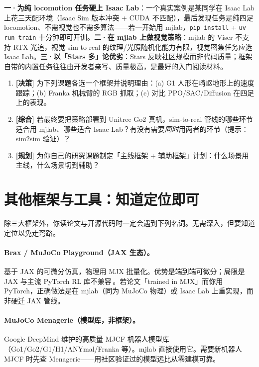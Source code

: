 \begin{pitfall}[选型阶段三个高频踩坑]
\textbf{一·为纯 locomotion 任务硬上 Isaac Lab}：一个真实案例是某同学在 Isaac Lab 上花三天配环境（Isaac Sim 版本冲突 + CUDA 不匹配），最后发现任务是纯四足 locomotion、不需视觉也不需多算法——若一开始用 mjlab，\verb|pip install| + \verb|uv run train| 十分钟即可开训。\textbf{二·在 mjlab 上做视觉策略}：mjlab 的 Viser 不支持 RTX 光追，视觉 sim-to-real 的纹理/光照随机化能力有限，视觉密集任务应选 Isaac Lab。\textbf{三·以「Stars 多」论优劣}：Stars 反映社区规模而非代码质量；框架自带的内置任务往往由开发者亲写、质量极高，是最好的入门阅读材料。
\end{pitfall}

\begin{practice}[练习·选型]
\begin{enumerate}
  \item \textbf{[决策]} 为下列课题各选一个框架并说明理由：(a) G1 人形在崎岖地形上的速度跟踪；(b) Franka 机械臂的 RGB 抓取；(c) 对比 PPO/SAC/Diffusion 在四足上的表现。
  \item \textbf{[综合]} 若最终要把策略部署到 Unitree Go2 真机，sim-to-real 管线的哪些环节适合用 mjlab、哪些适合 Isaac Lab？有没有需要\emph{同时}用两者的环节（提示：sim2sim 验证）？
  \item \textbf{[规划]} 为你自己的研究课题制定「主线框架 + 辅助框架」计划：什么场景用主线，什么场景切到辅助？
\end{enumerate}
\end{practice}

\section{其他框架与工具：知道定位即可}
\label{sec:rlmc-eco-tools}

除三大框架外，你读论文与开源代码时一定会遇到下列名词。无需深入，但要知道定位以免走弯路。

\paragraph{Brax / MuJoCo Playground（JAX 生态）。}基于 JAX 的可微分仿真，物理用 MJX 批量化。优势是端到端可微分；局限是 JAX 与主流 PyTorch RL 库不兼容\,\cite{zakka2025playground}。若论文「trained in MJX」而你用 PyTorch，正确做法是在 mjlab（同为 MuJoCo 物理）或 Isaac Lab 上重实现，而非硬迁 JAX 管线。

\paragraph{MuJoCo Menagerie（模型库，非框架）。}Google DeepMind 维护的高质量 MJCF 机器人模型库（Go1/Go2/G1/H1/ANYmal/Franka 等）。mjlab 直接使用它。需要新机器人 MJCF 时先查 Menagerie——用社区验证过的模型远比从零建模可靠。

